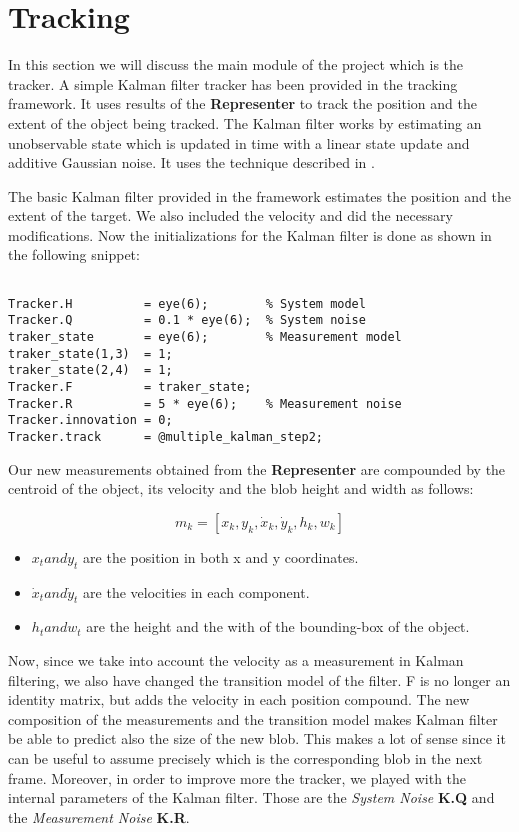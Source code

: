 \section{Tracking}

In this section we will discuss the main module of the project which is the tracker. A simple Kalman filter tracker has been provided in the tracking framework. It uses results of the \textbf{Representer} to track the position and the extent of the object being tracked. The Kalman filter works by estimating an unobservable state which is updated in time with a linear state update and additive Gaussian noise. It uses the technique described in \cite{Arulampalam01atutorial}.

The basic Kalman filter provided in the framework estimates the position and the extent of the target. We also included the velocity and did the necessary modifications. Now the initializations for the Kalman filter is done as shown in the following snippet:

\begin{verbatim}

Tracker.H          = eye(6);        % System model
Tracker.Q          = 0.1 * eye(6);  % System noise
traker_state       = eye(6);        % Measurement model
traker_state(1,3)  = 1;
traker_state(2,4)  = 1;
Tracker.F          = traker_state;
Tracker.R          = 5 * eye(6);    % Measurement noise
Tracker.innovation = 0;
Tracker.track      = @multiple_kalman_step2;
\end{verbatim}

Our new measurements obtained from the \textbf{Representer} are compounded by the centroid of the object, its velocity and the blob height and width as follows:

\begin{equation} m_{k} = [x_{k}, y_{k}, \dot{x}_{k}, \dot{y}_{k}, h_{k}, w_{k}] \end{equation}

\begin{itemize}
	\item $x_{t} and y_{t}$ are the position in both x and y coordinates.
	\item $\dot{x}_{t} and \dot{y}_{t}$ are the velocities in each component.
	\item $h_{t} and w_{t}$ are the height and the with of the bounding-box of the object.
\end{itemize}

Now, since we take into account the velocity as a measurement in Kalman filtering, we also have changed the transition model of the filter. F is no longer an identity matrix, but adds the velocity in each position compound. The new composition of the measurements and the transition model makes Kalman filter be able to predict also the size of the new blob. This makes a lot of sense since it can be useful to assume precisely which is the corresponding blob in the next frame. Moreover, in order to improve more the tracker, we played with the internal parameters of the Kalman filter. Those are the \textit{System Noise} \textbf{K.Q} and the \textit{Measurement Noise} \textbf{K.R}. 

